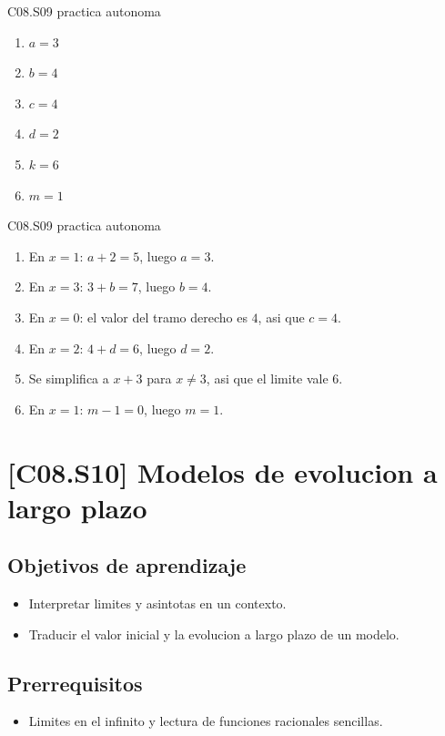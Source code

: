 \begin{shortanswer}{C08.S09 practica autonoma}
\begin{enumerate}[label=\textbf{PX-C08.S09-\arabic*:}, leftmargin=*]
  \item \(a=3\)
  \item \(b=4\)
  \item \(c=4\)
  \item \(d=2\)
  \item \(k=6\)
  \item \(m=1\)
\end{enumerate}
\end{shortanswer}

\begin{fullsolution}{C08.S09 practica autonoma}
\begin{enumerate}[label=\textbf{PX-C08.S09-\arabic*:}, leftmargin=*]
  \item En \(x=1\): \(a+2=5\), luego \(a=3\).
  \item En \(x=3\): \(3+b=7\), luego \(b=4\).
  \item En \(x=0\): el valor del tramo derecho es \(4\), asi que \(c=4\).
  \item En \(x=2\): \(4+d=6\), luego \(d=2\).
  \item Se simplifica a \(x+3\) para \(x\neq 3\), asi que el limite vale \(6\).
  \item En \(x=1\): \(m-1=0\), luego \(m=1\).
\end{enumerate}
\end{fullsolution}

\section{[C08.S10] Modelos de evolucion a largo plazo}

\subsection*{Objetivos de aprendizaje}
\begin{itemize}
  \item Interpretar limites y asintotas en un contexto.
  \item Traducir el valor inicial y la evolucion a largo plazo de un modelo.
\end{itemize}

\subsection*{Prerrequisitos}
\begin{itemize}
  \item Limites en el infinito y lectura de funciones racionales sencillas.
\end{itemize}

